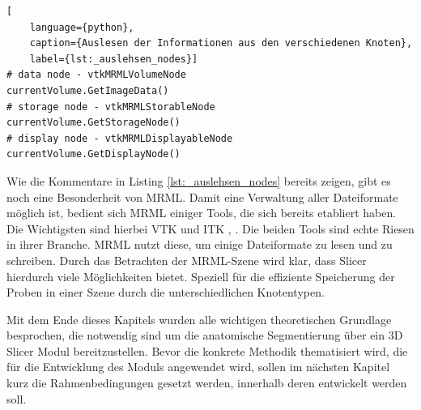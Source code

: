 \pagebreak

\begin{lstlisting}[
	language={python},
	caption={Auslesen der Informationen aus den verschiedenen Knoten},
	label={lst:_auslehsen_nodes}]
# data node - vtkMRMLVolumeNode
currentVolume.GetImageData()
# storage node - vtkMRMLStorableNode
currentVolume.GetStorageNode()
# display node - vtkMRMLDisplayableNode
currentVolume.GetDisplayNode()
\end{lstlisting}

Wie die Kommentare in Listing \ref{lst:_auslehsen_nodes} bereits zeigen, gibt es
noch eine Besonderheit von \ac{MRML}. Damit eine Verwaltung aller Dateiformate möglich
ist, bedient sich \ac{MRML} einiger Tools, die sich bereits etabliert haben. Die
Wichtigsten sind hierbei \ac{VTK} und \ac{ITK} \citep[vgl.][K.~1.1]{vtk2006}, \citep[vgl.][K.~1.1]{itkguide2015}.
Die beiden Tools sind echte Riesen in ihrer Branche. \ac{MRML} nutzt diese, um
einige Dateiformate zu lesen und zu schreiben. Durch das Betrachten der \ac{MRML}-Szene
wird klar, dass Slicer hierdurch viele Möglichkeiten bietet. Speziell für die
effiziente Speicherung der Proben in einer Szene durch die unterschiedlichen
Knotentypen.

Mit dem Ende dieses Kapitels wurden alle wichtigen theoretischen Grundlage
besprochen, die notwendig sind um die anatomische Segmentierung über ein 3D Slicer
Modul bereitzustellen. Bevor die konkrete Methodik thematisiert wird, die für die
Entwicklung des Moduls angewendet wird, sollen im nächsten Kapitel kurz die
Rahmenbedingungen gesetzt werden, innerhalb deren entwickelt werden soll.

